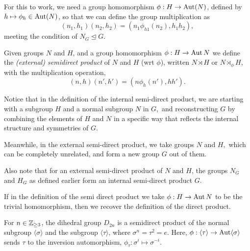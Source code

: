 For this to work, we need a group homomorphism $\phi: H \to \operatorname{Aut}(N)$, defined by $h \mapsto \phi_h \in \operatorname{Aut}(N)$,  so that we can define the group multiplication as
$$ (n_1,h_1)(n_2,h_2)=(n_1\phi_{h1}(n_2),h_1h_2),$$
meeting the condition of $N_G \trianglelefteq G.$



\begin{definition}
  Given groups $N$ and $H$, and a group homomorphism $\phi:H\to \operatorname{Aut} N$ we define the
  \emph{(external) semidirect product} of $N$ and $H$ (wrt $\phi$), written $N\rtimes H$
  or $N\rtimes_{\phi} H$, with the multiplication operation,
  \[(n,h)(n',h')=(n\phi_h(n'), hh').\]
  \label{def:exSemidirProd}
\end{definition}

\begin{remark}
    Notice that in the definition of the internal semi-direct product, we are starting with a subgroup $H$ and a normal subgroup $N$ in $G,$ and reconstructing $G$ by combining the elements of $H$ and $N$ in a specific way that reflects the internal structure and symmetries of $G$. 
    
    Meanwhile, in the external semi-direct product, we take groups $N$ and $H,$ which can be completely unrelated, and form a new group $G$ out of them. 

    Also note that for an external semi-direct product of $N$ and $H$, the groups $N_G$ and $H_G$ as defined earlier form an internal semi-direct product $G.$
\end{remark}
\begin{remark}
     If in the definition of the semi direct product we take $\phi:H\to\operatorname{Aut} N$ to be the trivial homomorphism, then we recover the definition of the direct product.
  \label{ex:trivialHomDirecProd}
\end{remark}

\begin{example}
  For $n\in\mathbb Z_{\geq 3}$, the dihedral group $D_{2n}$ is a semidirect product of the normal
  subgroup $\langle \sigma \rangle$ and the subgroup $\langle \tau \rangle$, where $\sigma
  ^n=\tau^2=e$. Here, $\phi:\langle \tau \rangle\to \operatorname{Aut} \langle \sigma \rangle$ sends
  $\tau$ to the inversion automorphism, $\phi_{\tau}:\sigma^i\mapsto \sigma^{-i}$.
\end{example}

